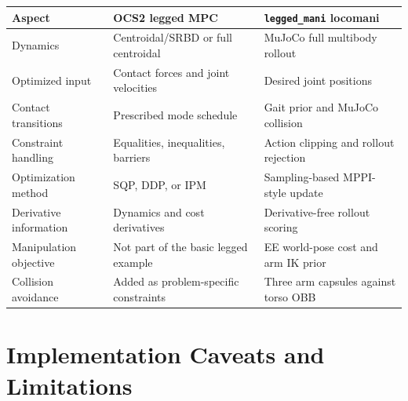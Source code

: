 \documentclass[11pt,a4paper]{article}
\newcommand{\code}[1]{\texttt{#1}}
\begin{document}
\begin{center}
\begin{tabular}{p{}p{}p{}}
\toprule
Aspect & OCS2 legged MPC & \code{legged\_mani} locomani\\
\midrule
Dynamics & Centroidal/SRBD or full centroidal & MuJoCo full multibody rollout\\
Optimized input & Contact forces and joint velocities & Desired joint positions\\
Contact transitions & Prescribed mode schedule & Gait prior and MuJoCo collision\\
Constraint handling & Equalities, inequalities, barriers & Action clipping and rollout rejection\\
Optimization method & SQP, DDP, or IPM & Sampling-based MPPI-style update\\
Derivative information & Dynamics and cost derivatives & Derivative-free rollout scoring\\
Manipulation objective & Not part of the basic legged example & EE world-pose cost and arm IK prior\\
Collision avoidance & Added as problem-specific constraints & Three arm capsules against torso OBB\\
\bottomrule
\end{tabular}
\end{center}

\section{Implementation Caveats and Limitations}
\end{document}
